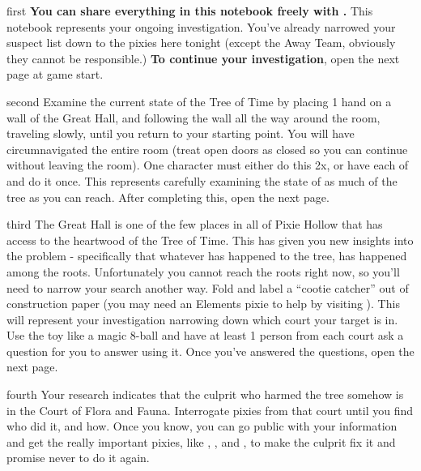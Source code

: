 \documentclass[notebook]{PP} %
\begin{document}
\startnotebook{\nTree{}}

\begin{page}{first}
\textbf{You can share everything in this notebook freely with \cSHelp{}.} 
This notebook represents your ongoing investigation. You've already narrowed your suspect list down to the pixies here tonight (except the Away Team, obviously they cannot be responsible.) \textbf{To continue your investigation}, open the next page at game start.
\end{page}

\begin{page}{second}
Examine the current state of the Tree of Time by placing 1 hand on a wall of the Great Hall, and following the wall all the way around the room, traveling slowly, until you return to your starting point. You will have circumnavigated the entire room (treat open doors as closed so you can continue without leaving the room). One character must either do this 2x, or have each of \cSHelp{} and \cMTree{} do it once. This represents carefully examining the state of as much of the tree as you can reach. After completing this, open the next page.
\end{page}

\begin{page}{third}
The Great Hall is one of the few places in all of Pixie Hollow that has access to the heartwood of the Tree of Time. This has given you new insights into the problem - specifically that whatever has happened to the tree, has happened among the roots. Unfortunately you cannot reach the roots right now, so you'll need to narrow your search another way. Fold and label a ``cootie catcher'' out of construction paper (you may need an Elements pixie to help by visiting \sResourceElements{}). This will represent your investigation narrowing down which court your target is in. Use the toy like a magic 8-ball and have at least 1 person from each court ask a question for you to answer using it. Once you've answered the questions, open the next page.
\end{page}

\begin{page}{fourth}
Your research indicates that the culprit who harmed the tree somehow is in the Court of Flora and Fauna. Interrogate pixies from that court until you find who did it, and how. Once you know, you can go public with your information and get the really important pixies, like \cMHead{}, \cSAdvisor{}, and \cSHead{}, to make the culprit fix it and promise never to do it again.
\end{page}

\endnotebook
\end{document}
